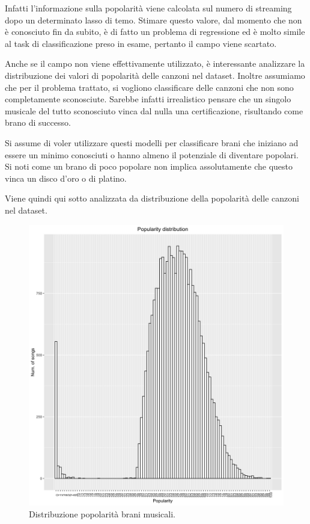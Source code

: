 Infatti l'informazione sulla popolarità viene calcolata sul numero di streaming dopo un determinato lasso di temo. Stimare questo valore, dal momento che non è conosciuto fin da subito, è di fatto un problema di regressione ed è molto simile al task di classificazione preso in esame, pertanto il campo viene scartato.

Anche se il campo non viene effettivamente utilizzato, è interessante analizzare la distribuzione dei valori di popolarità delle canzoni nel dataset. Inoltre assumiamo che per il problema trattato, si vogliono classificare delle canzoni che non sono completamente sconosciute. Sarebbe infatti irrealistico pensare che un singolo musicale del tutto sconosciuto vinca dal nulla una certificazione, risultando come brano di successo. 

Si assume di voler utilizzare questi modelli per classificare brani che iniziano ad essere un minimo conosciuti o hanno almeno il potenziale di diventare popolari. Si noti come un brano di poco popolare non implica assolutamente che questo vinca un disco d'oro o di platino.

Viene quindi qui sotto analizzata da distribuzione della popolarità delle canzoni nel dataset.


\begin{figure}[H]
	\centering
	\includegraphics[width=13cm]{../images/popularity_distribution.png}
	\caption{Distribuzione popolarità brani musicali.}
\end{figure}


